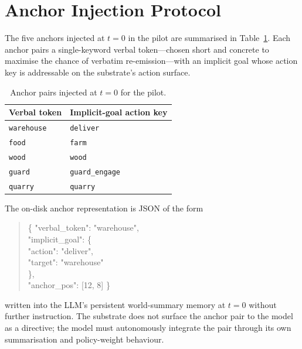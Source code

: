 \section{Anchor Injection Protocol}
\label{app:anchors}

The five anchors injected at $t = 0$ in the pilot are summarised
in Table~\ref{tab:anchors}. Each anchor pairs a single-keyword
verbal token---chosen short and concrete to maximise the chance of
verbatim re-emission---with an implicit goal whose action key is
addressable on the substrate's action surface.

\begin{table}[h]
  \centering
  \footnotesize
  \begin{tabular}{l l}
    \toprule
    Verbal token & Implicit-goal action key \\
    \midrule
    \texttt{warehouse} & \texttt{deliver} \\
    \texttt{food}      & \texttt{farm} \\
    \texttt{wood}      & \texttt{wood} \\
    \texttt{guard}     & \texttt{guard\_engage} \\
    \texttt{quarry}    & \texttt{quarry} \\
    \bottomrule
  \end{tabular}
  \caption{Anchor pairs injected at $t = 0$ for the pilot.}
  \label{tab:anchors}
\end{table}

The on-disk anchor representation is JSON of the form

\begin{quote}\small\ttfamily
\{ "verbal\_token": "warehouse",\\
\hspace*{1em} "implicit\_goal": \{\\
\hspace*{2em} "action": "deliver",\\
\hspace*{2em} "target": "warehouse"\\
\hspace*{1em} \},\\
\hspace*{1em} "anchor\_pos": [12, 8] \}
\end{quote}

\noindent
written into the LLM's persistent world-summary memory at $t = 0$
without further instruction. The substrate does not surface the
anchor pair to the model as a directive; the model must autonomously
integrate the pair through its own summarisation and policy-weight
behaviour.

